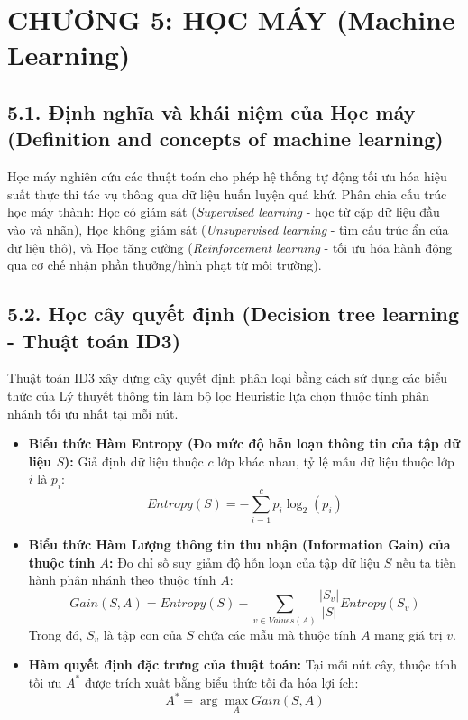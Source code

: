 \documentclass[../main.tex]{subfiles}
\begin{document}

\section{CHƯƠNG 5: HỌC MÁY (Machine Learning)}

\subsection{5.1. Định nghĩa và khái niệm của Học máy (Definition and concepts of machine learning)}
Học máy nghiên cứu các thuật toán cho phép hệ thống tự động tối ưu hóa hiệu suất thực thi tác vụ thông qua dữ liệu huấn luyện quá khứ. Phân chia cấu trúc học máy thành: Học có giám sát (\textit{Supervised learning} - học từ cặp dữ liệu đầu vào và nhãn), Học không giám sát (\textit{Unsupervised learning} - tìm cấu trúc ẩn của dữ liệu thô), và Học tăng cường (\textit{Reinforcement learning} - tối ưu hóa hành động qua cơ chế nhận phần thưởng/hình phạt từ môi trường).

\subsection{5.2. Học cây quyết định (Decision tree learning - Thuật toán ID3)}
Thuật toán ID3 xây dựng cây quyết định phân loại bằng cách sử dụng các biểu thức của Lý thuyết thông tin làm bộ lọc Heuristic lựa chọn thuộc tính phân nhánh tối ưu nhất tại mỗi nút.
\begin{itemize}
    \item \textbf{Biểu thức Hàm Entropy (Đo mức độ hỗn loạn thông tin của tập dữ liệu $S$):} Giả định dữ liệu thuộc $c$ lớp khác nhau, tỷ lệ mẫu dữ liệu thuộc lớp $i$ là $p_i$:
    \begin{equation}
        Entropy(S) = - \sum_{i=1}^{c} p_i \log_2(p_i)
    \end{equation}
    \item \textbf{Biểu thức Hàm Lượng thông tin thu nhận (Information Gain) của thuộc tính $A$:} Đo chỉ số suy giảm độ hỗn loạn của tập dữ liệu $S$ nếu ta tiến hành phân nhánh theo thuộc tính $A$:
    \begin{equation}
        Gain(S, A) = Entropy(S) - \sum_{v \in Values(A)} \frac{|S_v|}{|S|} Entropy(S_v)
    \end{equation}
    Trong đó, $S_v$ là tập con của $S$ chứa các mẫu mà thuộc tính $A$ mang giá trị $v$.
    \item \textbf{Hàm quyết định đặc trưng của thuật toán:} Tại mỗi nút cây, thuộc tính tối ưu $A^*$ được trích xuất bằng biểu thức tối đa hóa lợi ích:
    \begin{equation}
        A^* = \arg\max_{A} Gain(S, A)
    \end{equation}
\end{itemize}
\end{document}

